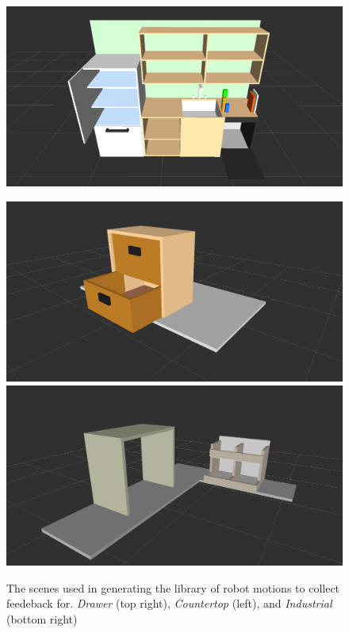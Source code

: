 \documentclass[letterpaper, 10 pt, conference]{ieeeconf}  %
\begin{document}
\begin{figure}
\centering
  \includegraphics[trim = 70mm 0mm 70mm 0mm, width=0.62\columnwidth, clip=true]{pictures/countertop_scene2}
  \begin{minipage}[b][][s]{0.352\columnwidth}
  \centering
    \includegraphics[trim = 70mm 0mm 70mm 0mm, width=\textwidth, clip=true]{pictures/drawer_scene2}
    \vfill
    \includegraphics[trim = 30mm 0mm 30mm 0mm, width=\textwidth, clip=true]{pictures/industrial_scene2}
  \end{minipage}
\caption{The scenes used in generating the library of robot motions to collect feedeback for. \emph{Drawer} (top right), \emph{Countertop} (left), and \emph{Industrial} (bottom right)}\label{fig:scenes}
\end{figure}
\end{document}

